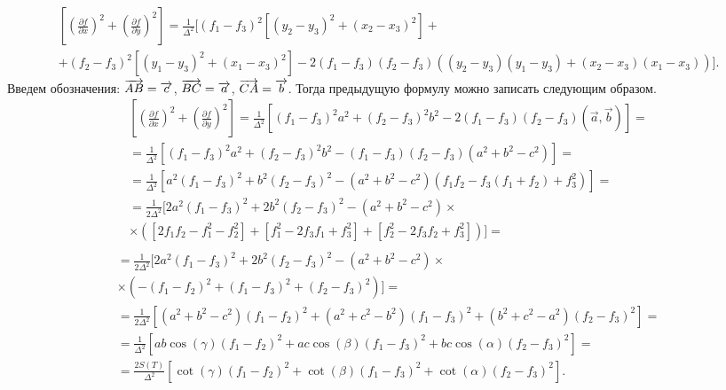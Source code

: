     \begin{multline*}
        \left[\left(\frac{\partial f}{\partial x}\right)^2 + \left(\frac{\partial f}{\partial y}\right)^2 \right] = 
        \frac{1}{\Delta^2} 
        [
            (f_1 - f_3)^2 [(y_2 - y_3)^2 + (x_2 - x_3)^2] + \\ + (f_2 - f_3)^2 [(y_1 - y_3)^2 + (x_1 - x_3)^2] %
            - 2 (f_1 - f_3)(f_2 - f_3)((y_2 - y_3)(y_1 - y_3) + (x_2 - x_3)(x_1 - x_3))
        ].
    \end{multline*}
    Введем обозначения: $\overrightarrow{AB} = \overrightarrow{c}$, $\overrightarrow{BC} = \overrightarrow{a}$, $\overrightarrow{CA} = \overrightarrow{b}$. Тогда предыдущую формулу можно записать следующим образом.
    \begin{multline*}
        \left[\left(\frac{\partial f}{\partial x}\right)^2 + \left(\frac{\partial f}{\partial y}\right)^2 \right] = 
        \frac{1}{\Delta^2} 
        \left[
            (f_1 - f_3)^2 a^2 + (f_2 - f_3)^2 b^2 - 2 (f_1 - f_3)(f_2 - f_3)(\vec{a}, \vec{b}) 
        \right] = \\
        = \frac{1}{\Delta^2} 
        \left[
            (f_1 - f_3)^2 a^2 + (f_2 - f_3)^2 b^2 - (f_1 - f_3)(f_2 - f_3)(a^2 + b^2 - c^2) 
        \right] = \\
        = \frac{1}{\Delta^2} 
        \left[
            a^2 (f_1 - f_3)^2 + b^2 (f_2 - f_3)^2 - (a^2 + b^2 - c^2)(f_1 f_2 - f_3(f_1 + f_2) + f_3^2)
        \right] = \\
        = \frac{1}{2 \Delta^2} 
        [
            2 a^2 (f_1 - f_3)^2 + 2 b^2 (f_2 - f_3)^2 - (a^2 + b^2 - c^2) \times \\
            \times ([2 f_1 f_2 - f_1^2 - f_2 ^ 2] + [f_1 ^2 - 2 f_3 f_1 + f_3 ^ 2] + [f_2^2 - 2 f_3 f_2 + f_3^2])
        ] = \\
      \end{multline*}
      \begin{multline*}
        = \frac{1}{2 \Delta^2} 
        [
            2 a^2 (f_1 - f_3)^2 + 2 b^2 (f_2 - f_3)^2 - 
            \left( a^2 + b^2 - c^2 \right) \times \\ \times \left(-(f_1 - f_2)^2 + (f_1 - f_3)^2 + (f_2 - f_3)^2 \right)
        ] = \\
        = \frac{1}{2 \Delta^2} 
        \left[
            (a^2 + b^2 - c^2)(f_1 - f_2)^2 + (a^2 + c^2 - b^2)(f_1 - f_3)^2 + (b^2 + c^2 - a^2)(f_2 - f_3)^2 
        \right] = \\
        = \frac{1}{\Delta^2} 
        \left[
            ab \cos{(\gamma)} (f_1 - f_2)^2 + ac \cos{(\beta)}(f_1 - f_3)^2 + bc \cos{(\alpha)}(f_2 - f_3)^2 
        \right] = \\
        = \frac{2S(T)}{\Delta^2} 
        \left[
            \cot{(\gamma)} (f_1 - f_2)^2 + \cot{(\beta)}(f_1 - f_3)^2 + \cot{(\alpha)}(f_2 - f_3)^2 
        \right].
    \end{multline*}
